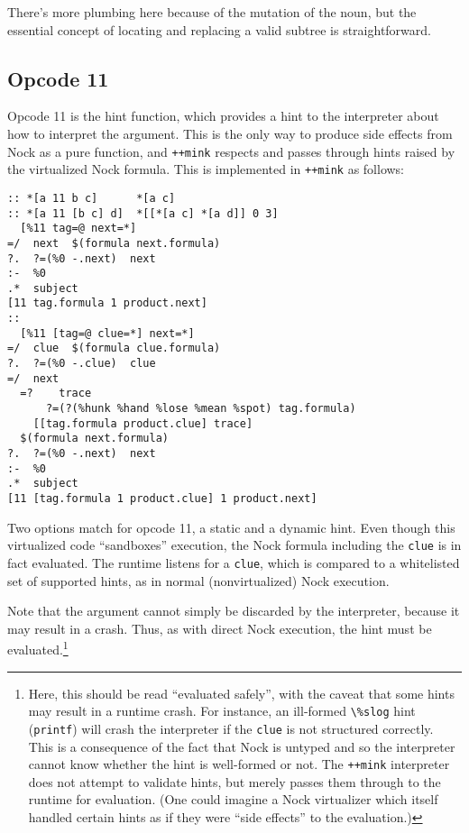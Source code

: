 \documentclass[twoside]{article}
\begin{document}
There's more plumbing here because of the mutation of the noun, but the essential concept of locating and replacing a valid subtree is straightforward.

\subsection{Opcode 11}

Opcode 11 is the hint function, which provides a hint to the interpreter about how to interpret the argument.  This is the only way to produce side effects from Nock as a pure function, and \lstinline[style=inlinecode]{++mink} respects and passes through hints raised by the virtualized Nock formula.  This is implemented in \lstinline[style=inlinecode]{++mink} as follows:

\begin{lstlisting}[style=listingcode]
:: *[a 11 b c]      *[a c]
:: *[a 11 [b c] d]  *[[*[a c] *[a d]] 0 3]
  [%11 tag=@ next=*]
=/  next  $(formula next.formula)
?.  ?=(%0 -.next)  next
:-  %0
.*  subject
[11 tag.formula 1 product.next]
::
  [%11 [tag=@ clue=*] next=*]
=/  clue  $(formula clue.formula)
?.  ?=(%0 -.clue)  clue
=/  next
  =?    trace
      ?=(?(%hunk %hand %lose %mean %spot) tag.formula)
    [[tag.formula product.clue] trace]
  $(formula next.formula)
?.  ?=(%0 -.next)  next
:-  %0
.*  subject
[11 [tag.formula 1 product.clue] 1 product.next]
\end{lstlisting}

\noindent
Two options match for opcode 11, a static and a dynamic hint.  Even though this virtualized code ``sandboxes'' execution, the Nock formula including the \texttt{clue} is in fact evaluated.  The runtime listens for a \texttt{clue}, which is compared to a whitelisted set of supported hints, as in normal (nonvirtualized) Nock execution.

Note that the argument cannot simply be discarded by the interpreter, because it may result in a crash.  Thus, as with direct Nock execution, the hint must be evaluated.\footnote{Here, this should be read ``evaluated safely'', with the caveat that some hints may result in a runtime crash.  For instance, an ill-formed \lstinline[style=inlinecode]{\%slog} hint (\texttt{printf}) will crash the interpreter if the \texttt{clue} is not structured correctly.  This is a consequence of the fact that Nock is untyped and so the interpreter cannot know whether the hint is well-formed or not.  The \lstinline[style=inlinecode]{++mink} interpreter does not attempt to validate hints, but merely passes them through to the runtime for evaluation.  (One could imagine a Nock virtualizer which itself handled certain hints as if they were ``side effects'' to the evaluation.)}
\end{document}
